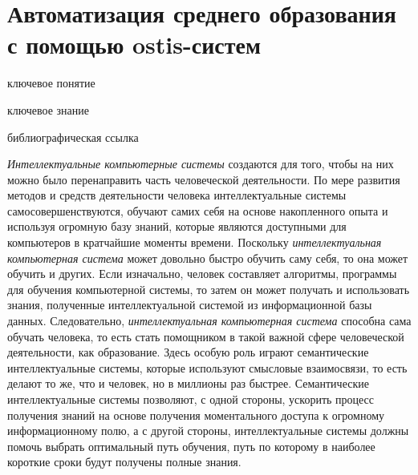 \section{Автоматизация среднего образования с помощью ostis-систем}
\label{sec_automation_secondary_education}

\begin{SCn}
	
	\bigskip
	
	\begin{scnrelfromlist}{ключевое понятие}
	\end{scnrelfromlist}
	
	\bigskip
	
	\begin{scnrelfromlist}{ключевое знание}
	\end{scnrelfromlist}
	
	\bigskip
	
	\begin{scnrelfromlist}{библиографическая ссылка}
	\end{scnrelfromlist}
	
\end{SCn}

\textit{Интеллектуальные компьютерные системы} создаются для того, чтобы на них можно было перенаправить часть человеческой деятельности. По мере развития методов и средств деятельности человека интеллектуальные системы самосовершенствуются, обучают самих себя на основе накопленного опыта и используя огромную базу знаний, которые являются доступными для компьютеров в кратчайшие моменты времени. Поскольку \textit{интеллектуальная компьютерная система} может довольно быстро обучить саму себя, то она может обучить и других. Если изначально, человек составляет алгоритмы, программы для обучения компьютерной системы, то затем он может получать и использовать знания, полученные интеллектуальной системой из информационной базы данных. Следовательно, \textit{интеллектуальная компьютерная система} способна сама обучать человека, то есть стать помощником в такой важной сфере человеческой деятельности, как образование. Здесь особую роль играют семантические интеллектуальные системы, которые используют смысловые взаимосвязи, то есть делают то же, что и человек, но в миллионы раз быстрее. Семантические интеллектуальные системы позволяют, с одной стороны, ускорить процесс получения знаний на основе получения моментального доступа к огромному информационному полю, а с другой стороны, интеллектуальные системы должны помочь выбрать оптимальный путь обучения, путь по которому в наиболее короткие сроки будут получены полные знания.

